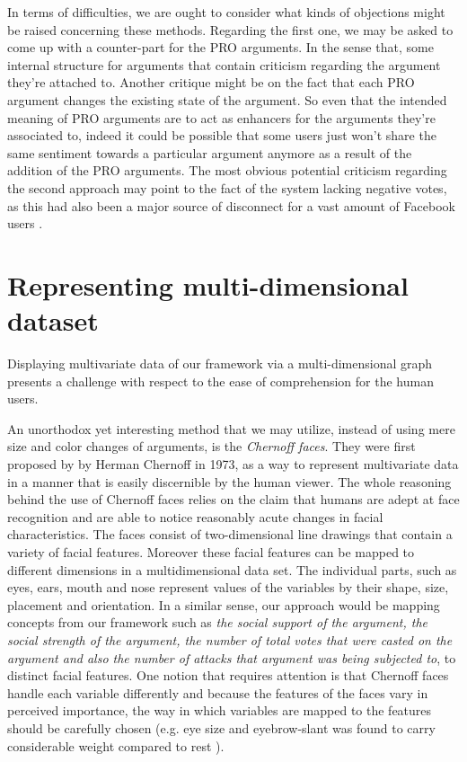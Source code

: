 \documentclass{article}
\begin{document}
In terms of difficulties, we are ought to consider what kinds of objections might be raised concerning these methods. Regarding the first one, we may be asked to come up with a counter-part for the PRO arguments. In the sense that,  some internal structure for arguments that contain criticism regarding the argument they're attached to. Another critique might be on the fact that each PRO argument changes the existing state of the argument. So even that the intended meaning of PRO arguments are to act as enhancers for the arguments they're associated to, indeed it could be possible that some users just won't share the same sentiment towards a particular argument anymore as a result of the addition of the PRO arguments. The most obvious potential criticism regarding the second approach may point to the fact of the system lacking negative votes, as this had also been a major source of disconnect for a vast amount of Facebook users \cite{FBdislike}.

\section{Representing multi-dimensional dataset} 
Displaying multivariate data of our framework via a multi-dimensional graph presents a challenge with respect to the ease of comprehension for the human users.

An unorthodox yet interesting method that we may utilize, instead of using mere size and color changes of arguments, is the \textit{Chernoff faces}. They were first proposed by by Herman Chernoff \cite{Chernoff73} in 1973, as a way to represent multivariate data in a manner that is easily discernible by the human viewer.  The whole reasoning behind the use of Chernoff faces relies on the claim that humans are adept at face recognition and are able to notice reasonably acute changes in facial characteristics. The faces consist of two-dimensional line drawings that contain a variety of facial features. Moreover these facial features can be mapped to different dimensions in a multidimensional data set. The individual parts, such as eyes, ears, mouth and nose represent values of the variables by their shape, size, placement and orientation. In a similar sense, our approach would be mapping concepts from our framework such as  \textit{the social support of the argument, the social strength of the argument, the number of total votes that were casted on the argument and also the number of attacks that argument was being subjected to}, to distinct facial features. One notion that requires attention is that Chernoff faces handle each variable differently and because the features of the faces vary in perceived importance, the way in which variables are mapped to the features should be carefully chosen (e.g. eye size and eyebrow-slant was found to carry considerable weight compared to rest \cite{Morris00}).
\end{document}
